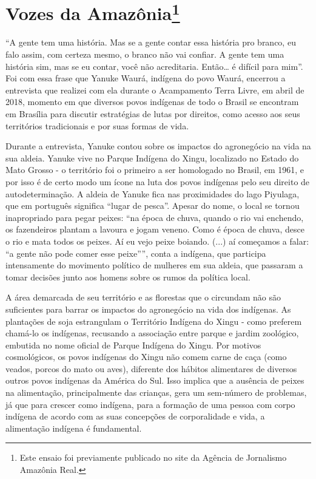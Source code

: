 \chapter{Vozes da Amazônia\footnote{Este ensaio foi
  previamente publicado no site da Agência de Jornalismo Amazônia Real.}}

``A gente tem uma história. Mas se a gente contar essa história pro
branco, eu falo assim, com certeza mesmo, o branco não vai confiar. A
gente tem uma história sim, mas se eu contar, você não acreditaria.
Então\ldots{} é difícil para mim''. Foi com essa frase que Yanuke Waurá,
indígena do povo Waurá, encerrou a entrevista que realizei com ela
durante o Acampamento Terra Livre, em abril de 2018, momento em que
diversos povos indígenas de todo o Brasil se encontram em Brasília para
discutir estratégias de lutas por direitos, como acesso aos seus
territórios tradicionais e por suas formas de vida.

Durante a entrevista, Yanuke contou sobre os impactos do agronegócio na
vida na sua aldeia. Yanuke vive no Parque Indígena do Xingu, localizado
no Estado do Mato Grosso - o território foi o primeiro a ser homologado
no Brasil, em 1961, e por isso é de certo modo um ícone na luta dos
povos indígenas pelo seu direito de autodeterminação. A aldeia de Yanuke
fica nas proximidades do lago Piyulaga, que em português significa
``lugar de pesca''. Apesar do nome, o local se tornou inapropriado para
pegar peixes: ``na época de chuva, quando o rio vai enchendo, os
fazendeiros plantam a lavoura e jogam veneno. Como é época de chuva,
desce o rio e mata todos os peixes. Aí eu vejo peixe boiando. (...) aí
começamos a falar: ``a gente não pode comer esse peixe'''', conta a
indígena, que participa intensamente do movimento político de mulheres
em sua aldeia, que passaram a tomar decisões junto aos homens sobre os
rumos da política local.

A área demarcada de seu território e as florestas que o circundam não
são suficientes para barrar os impactos do agronegócio na vida dos
indígenas. As plantações de soja estrangulam o Território Indígena do
Xingu - como preferem chamá-lo os indígenas, recusando a associação
entre parque e jardim zoológico, embutida no nome oficial de Parque
Indígena do Xingu. Por motivos cosmológicos, os povos indígenas do Xingu
não comem carne de caça (como veados, porcos do mato ou aves), diferente
dos hábitos alimentares de diversos outros povos indígenas da América do
Sul. Isso implica que a ausência de peixes na alimentação,
principalmente das crianças, gera um sem-número de problemas, já que
para crescer como indígena, para a formação de uma pessoa com corpo
indígena de acordo com as suas concepções de corporalidade e vida, a
alimentação indígena é fundamental.

